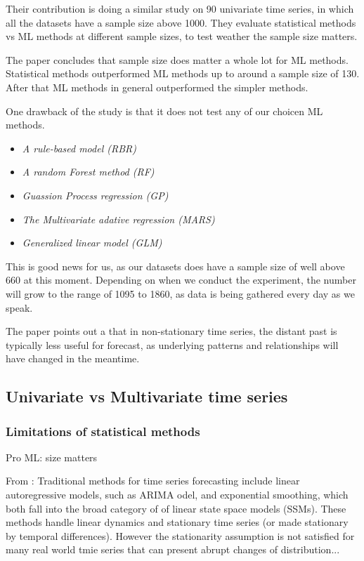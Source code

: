 Their contribution is doing a similar study on 90 univariate time series, in which 
all the datasets have a sample size above 1000. They evaluate statistical methods vs ML methods
at different sample sizes, to test weather the sample size matters.

The paper \cite{Cerqueira2019} concludes that sample size does matter a whole lot for ML methods.
Statistical methods outperformed ML methods up to around a sample size of 130. After that ML methods
in general outperformed the simpler methods.

One drawback of the \cite{Makridakis2018} study is that it does not test any of our choicen ML methods.

\begin{itemize}
  \item \textit{A rule-based model (RBR)}
  \item \textit{A random Forest method (RF)}
  \item \textit{Guassion Process regression (GP)}
  \item \textit{The Multivariate adative regression (MARS)}
  \item \textit{Generalized linear model (GLM)}
\end{itemize}

This is good news for us, as our datasets does have a sample size of well above 660 at this moment.
Depending on when we conduct the experiment, the number will grow to the range of 1095 to 1860,
as data is being gathered every day as we speak.

The paper \citet{Bandara2019} points out a that in non-stationary time series, the distant past is typically less
useful for forecast, as underlying patterns and relationships will have changed in the meantime.


\subsection{Univariate vs Multivariate time series}


\subsubsection{Limitations of statistical methods}
Pro ML: size matters \cite{Cerqueira2019}

From \cite{Guen2019}:
Traditional methods for time series forecasting include linear autoregressive models, such as
ARIMA odel, and exponential smoothing, which both fall into the broad category of of linear 
state space models (SSMs). These methods handle linear
dynamics and stationary time series (or made stationary by temporal differences).
However the stationarity assumption is not satisfied for many real world tmie series that can present
abrupt changes of distribution...